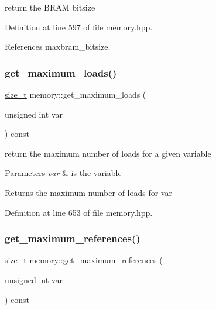 return the B\+R\+AM bitsize 



Definition at line 597 of file memory.\+hpp.



References maxbram\+\_\+bitsize.

\mbox{\label{classmemory_af59fd8089c95addbd19c330aa1af978a}} 
\subsubsection{\texorpdfstring{get\+\_\+maximum\+\_\+loads()}{get\_maximum\_loads()}}
{\footnotesize\ttfamily \hyperlink{tutorial__fpt__2017_2intro_2sixth_2test_8c_a7c94ea6f8948649f8d181ae55911eeaf}{size\+\_\+t} memory\+::get\+\_\+maximum\+\_\+loads (\begin{DoxyParamCaption}\item[{unsigned int}]{var }\end{DoxyParamCaption}) const\hspace{0.3cm}{\ttfamily [inline]}}



return the maximum number of loads for a given variable 


\begin{DoxyParams}{Parameters}
{\em var} & is the variable \\
\hline
\end{DoxyParams}
\begin{DoxyReturn}{Returns}
the maximum number of loads for var 
\end{DoxyReturn}


Definition at line 653 of file memory.\+hpp.

\mbox{\label{classmemory_a89891d351f4311540282f85f395160d4}} 
\subsubsection{\texorpdfstring{get\+\_\+maximum\+\_\+references()}{get\_maximum\_references()}}
{\footnotesize\ttfamily \hyperlink{tutorial__fpt__2017_2intro_2sixth_2test_8c_a7c94ea6f8948649f8d181ae55911eeaf}{size\+\_\+t} memory\+::get\+\_\+maximum\+\_\+references (\begin{DoxyParamCaption}\item[{unsigned int}]{var }\end{DoxyParamCaption}) const\hspace{0.3cm}{\ttfamily [inline]}}



